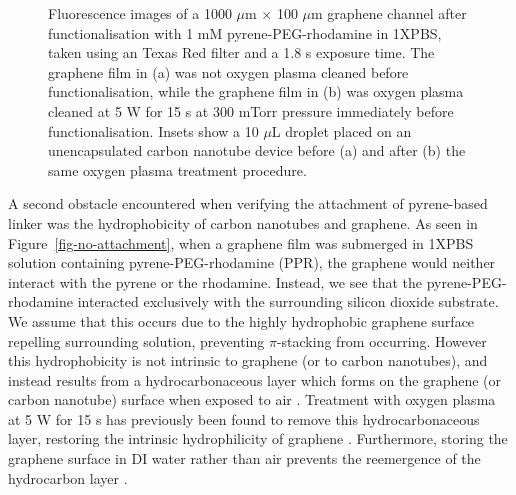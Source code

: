 \documentclass[
  a4paper,
]{scrbook}
\begin{document}
\begin{figure}
\begin{minipage}[t]{0.47\linewidth}
{{}

}

\subcaption{\label{fig-attachment-post-plasma}}
\end{minipage}%

\caption{\label{fig-hydrophobicity}Fluorescence images of a 1000
\(\mu\)m \(\times\) 100 \(\mu\)m graphene channel after
functionalisation with 1 mM pyrene-PEG-rhodamine in 1XPBS, taken using
an Texas Red filter and a 1.8 s exposure time. The graphene film in (a)
was not oxygen plasma cleaned before functionalisation, while the
graphene film in (b) was oxygen plasma cleaned at 5 W for 15 s at 300
mTorr pressure immediately before functionalisation. Insets show a 10
\(\mu\)L droplet placed on an unencapsulated carbon nanotube device
before (a) and after (b) the same oxygen plasma treatment procedure.}

\end{figure}

A second obstacle encountered when verifying the attachment of
pyrene-based linker was the hydrophobicity of carbon nanotubes and
graphene. As seen in Figure~\ref{fig-no-attachment}, when a graphene
film was submerged in 1XPBS solution containing pyrene-PEG-rhodamine
(PPR), the graphene would neither interact with the pyrene or the
rhodamine. Instead, we see that the pyrene-PEG-rhodamine interacted
exclusively with the surrounding silicon dioxide substrate. We assume
that this occurs due to the highly hydrophobic graphene surface
repelling surrounding solution, preventing \(\pi\)-stacking from
occurring. However this hydrophobicity is not intrinsic to graphene (or
to carbon nanotubes), and instead results from a hydrocarbonaceous layer
which forms on the graphene (or carbon nanotube) surface when exposed to
air \autocite{Ashraf2014,Stando2019}. Treatment with oxygen plasma at 5
W for 15 s has previously been found to remove this hydrocarbonaceous
layer, restoring the intrinsic hydrophilicity of graphene
\autocite{Shin2010}. Furthermore, storing the graphene surface in DI
water rather than air prevents the reemergence of the hydrocarbon layer
\autocite{Ashraf2014}.
\end{document}

